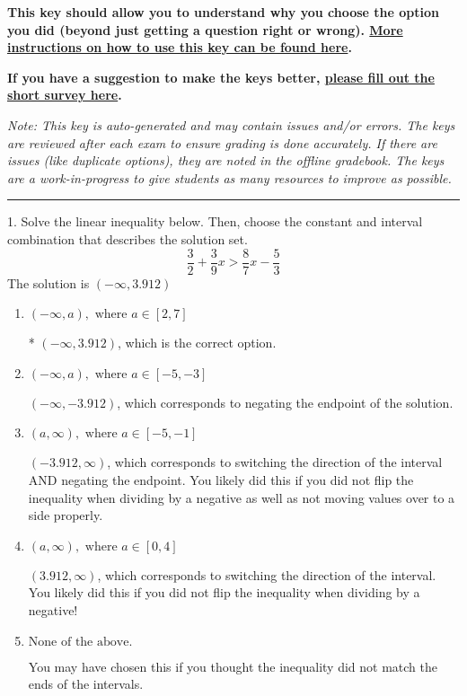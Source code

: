 \documentclass{extbook}[14pt]
\begin{document}
\textbf{This key should allow you to understand why you choose the option you did (beyond just getting a question right or wrong). \href{https://xronos.clas.ufl.edu/mac1105spring2020/courseDescriptionAndMisc/Exams/LearningFromResults}{More instructions on how to use this key can be found here}.}

\textbf{If you have a suggestion to make the keys better, \href{https://forms.gle/CZkbZmPbC9XALEE88}{please fill out the short survey here}.}

\textit{Note: This key is auto-generated and may contain issues and/or errors. The keys are reviewed after each exam to ensure grading is done accurately. If there are issues (like duplicate options), they are noted in the offline gradebook. The keys are a work-in-progress to give students as many resources to improve as possible.}

\rule{\textwidth}{0.4pt}

1. Solve the linear inequality below. Then, choose the constant and interval combination that describes the solution set.
\[ \frac{3}{2} + \frac{3}{9} x > \frac{8}{7} x - \frac{5}{3} \] 
The solution is $ (-\infty, 3.912) $ 

\begin{enumerate}[label=\Alph*.] 
\item $ (-\infty, a), \text{ where } a \in [2, 7] $ 

 * $(-\infty, 3.912)$, which is the correct option. 
\item $ (-\infty, a), \text{ where } a \in [-5, -3] $ 

  $(-\infty, -3.912)$, which corresponds to negating the endpoint of the solution. 
\item $ (a, \infty), \text{ where } a \in [-5, -1] $ 

  $(-3.912, \infty)$, which corresponds to switching the direction of the interval AND negating the endpoint. You likely did this if you did not flip the inequality when dividing by a negative as well as not moving values over to a side properly. 
\item $ (a, \infty), \text{ where } a \in [0, 4] $ 

  $(3.912, \infty)$, which corresponds to switching the direction of the interval. You likely did this if you did not flip the inequality when dividing by a negative! 
\item $ \text{None of the above}. $ 

 You may have chosen this if you thought the inequality did not match the ends of the intervals. 
\end{enumerate} 
 
\end{document}
